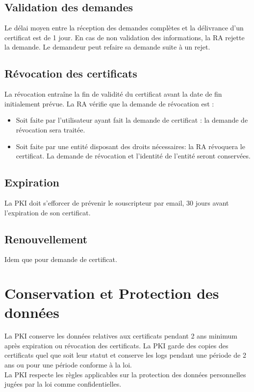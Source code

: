 \documentclass[a4paper,11pt,french]{book}
\begin{document}
\subsection{Validation  des demandes}
Le délai moyen entre la réception des demandes complètes et la délivrance d'un certificat est de 1 jour. En cas de non validation des informations, la RA rejette la demande. Le demandeur peut refaire sa demande suite à un rejet.

\subsection{Révocation des certificats}
La révocation entraîne la fin de validité du certificat avant la date de fin initialement prévue. La RA vérifie que la demande de révocation est :
\begin{itemize}
\item Soit faite par l'utilisateur ayant fait la demande de certificat :  la demande de révocation sera traitée.
\item Soit faite par une entité disposant des droits nécessaires: la RA révoquera le certificat. La demande de révocation et l'identité de l'entité seront conservées.
\end{itemize}

\subsection{Expiration}
La PKI doit s'efforcer de prévenir le souscripteur par email, 30 jours avant l'expiration de son certificat.

\subsection{Renouvellement}
Idem que pour demande de certificat.

\section{Conservation et Protection des données}
La PKI conserve les données relatives aux certificats pendant 2 ans minimum après expiration ou révocation des certificats. La PKI garde des copies des certificats quel que soit leur statut et conserve les logs pendant une période de 2 ans ou pour une période conforme à la loi. 
\\La PKI respecte les règles applicables sur la protection des données personnelles jugées par la loi comme confidentielles.
\end{document}
